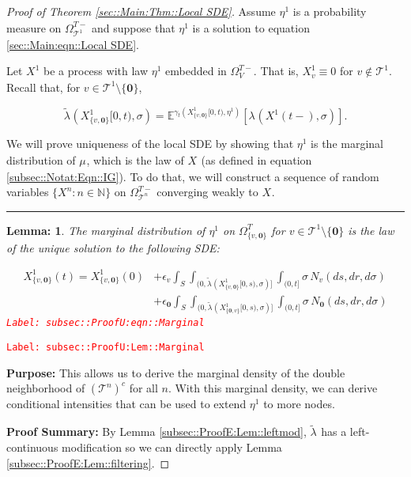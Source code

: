 \documentclass[12pt]{article}
\newcommand{\mb}{\mathbb}
\newcommand{\mc}{\mathcal}
\newcommand{\ep}{\epsilon}
\newcommand{\tr}{\textcolor{red}}
\newcommand{\labe}[1]{\tr{\texttt{Label: #1}}}
\newcommand{\purpose}{\textbf{Purpose: }}
\newcommand{\pfsum}{\textbf{Proof Summary: }}
\newcommand{\ind}{\hspace{24pt}}
\newcommand{\lin}{\rule{\linewidth}{0.4 pt}}
\newcommand{\exmu}[2]{\mb{E}^{#1}\left[#2\right]}	%
\renewcommand{\root}{\mathbf{0}}				%
\renewcommand{\v}{v}							%
\renewcommand{\S}{S}							%
\newcommand{\s}{\sigma}							%
\newcommand{\ev}[1]{\ep_{#1}}					%
\newcommand{\T}{T}								%
\newcommand{\OmegaV}[2]{\Omega_{#1}^{#2}}		%
\renewcommand{\t}{t}							%
\newcommand{\poiss}[1]{N_{#1}}						%
\newcommand{\pup}[1]{^{#1}}							%
\newcommand{\tree}{\mc{T}}							%
\newcommand{\V}{V}									%
\renewcommand{\tt}{s}								%
\renewcommand{\r}{r}								%
\newcommand{\numb}{n}								%
\newcommand{\rxvtn}[3]{X_{#1}^{#3}(#2)}				%
\newcommand{\rxvts}[2]{X_{#1}{#2}}					%
\newcommand{\rxvtsn}[3]{X_{#1}^{#3}{#2}}			%
\newcommand{\m}[3]{\mu_{#2#1}^{#3}}						%
\newcommand{\mmm}[3]{\eta_{#2#1}^{#3}}						%
\newcommand{\cm}{\gamma}							%
\newcommand{\rate}[1]{\lambda_{#1}}					%
\newcommand{\crate}[2]{\alt{\lambda}_{#1}^{#2}}		%
\newcommand{\alt}{\widetilde}						%
\newtheorem{lem}[thms]{Lemma: }
\begin{document}
\begin{proof}[Proof of Theorem \ref{sec::Main:Thm::Local SDE}]

Assume \(\mmm{}{}{1}\) is a probability measure on \(\OmegaV{\tree\pup{1}}{\T-}\) and suppose that \(\mmm{}{}{1}\) is a solution to equation \eqref{sec::Main:eqn::Local SDE}.

\ind Let \(\rxvtsn{}{}{1}\) be a process with law \(\mmm{}{}{1}\) embedded in \(\OmegaV{\V}{\T-}\). That is, \(\rxvtsn{\v}{}{1} \equiv 0\) for \(\v \notin \tree\pup{1}\). Recall that, for \(\v \in \tree\pup{1}\setminus\{\root\}\),

\[\crate{}{}(\rxvtsn{\{\v,\root\}}{[0,\t)}{1},\s) = \exmu{\cm_\t(\rxvtsn{\{\v,\root\}}{[0,\t)}{1},\mmm{}{}{1})}{\rate{}(\rxvtn{}{\t-}{1},\s)}.\]

\ind We will prove uniqueness of the local SDE by showing that \(\mmm{}{}{1}\) is the marginal distribution of \(\m{}{}{}\), which is the law of \(\rxvts{}{}\) (as defined in equation \eqref{subsec::Notat:Eqn::IG}). To do that, we will construct a sequence of random variables \(\{\rxvtsn{}{}{\numb}:\numb\in\mb{N}\}\) on \(\OmegaV{\tree\pup{\numb}}{\T-}\) converging weakly to \(\rxvts{}{}\). 

\lin

\begin{lem}
The marginal distribution of \(\mmm{}{}{1}\) on \(\OmegaV{\{\v,\root\}}{\T}\) for \(\v \in \tree\pup{1}\setminus\{\root\}\) is the law of the unique solution to the following SDE:

\begin{align}
\rxvtn{\{\v,\root\}}{\t}{1} = \rxvtn{\{\v,\root\}}{0}{1} &+ \ev{\v}\int_\S\int_{(0,\crate{}{}(\rxvtsn{\{\v,\root\}}{[0,\tt)}{1},\s)]}\int_{(0,t]}\s\,\poiss{\v}(d\tt,d\r,d\s)\nonumber\\
&+ \ev{\root}\int_\S\int_{(0,\crate{}{}(\rxvtsn{\{\root,\v\}}{[0,\tt)}{1},\s)]}\int_{(0,t]}\s\,\poiss{\root}(d\tt,d\r,d\s)
\label{subsec::ProofU:eqn::Marginal}
\end{align}
\labe{subsec::ProofU:eqn::Marginal}
\label{subsec::ProofU:Lem::Marginal}
\end{lem}
\labe{subsec::ProofU:Lem::Marginal}

\purpose This allows us to derive the marginal density of the double neighborhood of \((\tree\pup{n})^c\) for all \(\numb\). With this marginal density, we can derive conditional intensities that can be used to extend \(\mmm{}{}{1}\) to more nodes.

\pfsum By Lemma \ref{subsec::ProofE:Lem::leftmod}, \(\crate{}{}\) has a left-continuous modification so we can directly apply Lemma \ref{subsec::ProofE:Lem::filtering}.


\end{proof}
\end{document}
